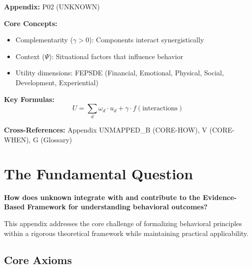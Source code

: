 \begin{tcolorbox}[colback=blue!5!white, colframe=blue!75!black,
    title=Quick Reference: Unknown]

\textbf{Appendix:} P02 (UNKNOWN)

\textbf{Core Concepts:}
\begin{itemize}[nosep]
\item Complementarity ($\gamma > 0$): Components interact synergistically
\item Context ($\Psi$): Situational factors that influence behavior
\item Utility dimensions: FEPSDE (Financial, Emotional, Physical, Social, Development, Experiential)
\end{itemize}

\textbf{Key Formulas:}
\begin{equation}
U = \sum_d \omega_d \cdot u_d + \gamma \cdot f(\text{interactions})
\end{equation}

\textbf{Cross-References:} Appendix UNMAPPED_B (CORE-HOW), V (CORE-WHEN), G (Glossary)
\end{tcolorbox}

\section{The Fundamental Question}
\label{sec:p02-fundamental}

\begin{tcolorbox}[
    colback=red!5!white,
    colframe=red!75!black,
    title={\textbf{Fundamental Question}}
]
\textbf{How does unknown integrate with and contribute to the
Evidence-Based Framework for understanding behavioral outcomes?}

This appendix addresses the core challenge of formalizing behavioral principles
within a rigorous theoretical framework while maintaining practical applicability.
\end{tcolorbox}


\subsection{Core Axioms}
\label{sec:p02-axioms}

